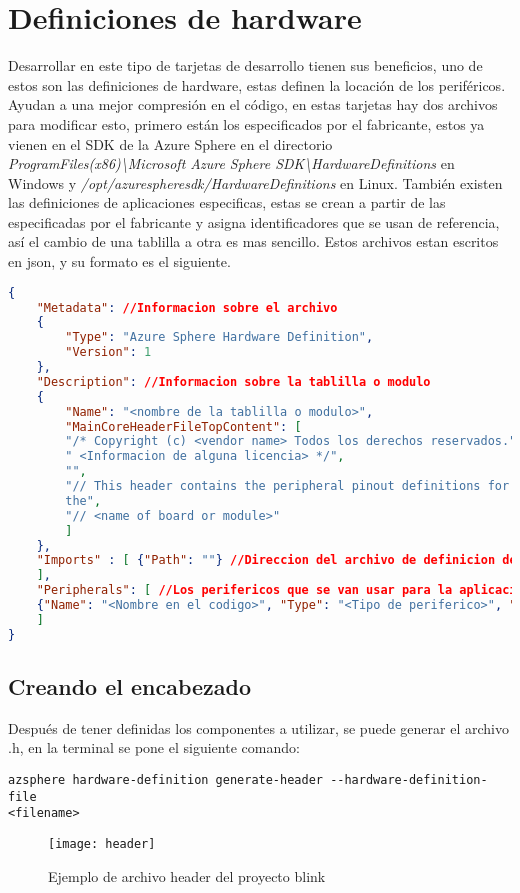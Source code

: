 \section{Definiciones de hardware}
Desarrollar en este tipo de tarjetas de desarrollo tienen sus beneficios, uno de estos son las definiciones de hardware, estas definen la locación de los periféricos. Ayudan a una mejor compresión en el código, en estas tarjetas hay dos archivos para modificar esto, primero están los especificados por el fabricante, estos ya vienen en el SDK de la Azure Sphere en el directorio \textit{ProgramFiles(x86)\textbackslash Microsoft Azure Sphere SDK\textbackslash HardwareDefinitions} en Windows y \textit{/opt/azurespheresdk/HardwareDefinitions} en Linux. También existen las definiciones de aplicaciones especificas, estas se crean a partir de las especificadas por el fabricante y asigna identificadores que se usan de referencia, así el cambio de una tablilla a otra es mas sencillo.
Estos archivos estan escritos en json, y su formato es el siguiente.
\begin{lstlisting}[language = json, firstnumber=1]
{
	"Metadata": //Informacion sobre el archivo
	{
		"Type": "Azure Sphere Hardware Definition",
		"Version": 1
	},
	"Description": //Informacion sobre la tablilla o modulo
	{
		"Name": "<nombre de la tablilla o modulo>",
		"MainCoreHeaderFileTopContent": [
		"/* Copyright (c) <vendor name> Todos los derechos reservados.",
		" <Informacion de alguna licencia> */",
		"",
		"// This header contains the peripheral pinout definitions for
		the",
		"// <name of board or module>"
		]
	},
	"Imports" : [ {"Path": ""} //Direccion del archivo de definicion de hardware para definir sobre ella
	],
	"Peripherals": [ //Los perifericos que se van usar para la aplicacion
	{"Name": "<Nombre en el codigo>", "Type": "<Tipo de periferico>", "Mapping": "<El nombre del periferico en el archivo importado>", "Comment": "<Informacion a destacar>"},
	]
}
\end{lstlisting}

\subsection{Creando el encabezado}
Después de tener definidas los componentes a utilizar, se puede generar el archivo .h, en la terminal se pone el siguiente comando:
\begin{verbatim}
azsphere hardware-definition generate-header --hardware-definition-file
<filename> 
\end{verbatim}
\begin{figure}[h]
	\centering
	\texttt{[image: header]}
	\caption{Ejemplo de archivo header del proyecto blink}
\end{figure}

